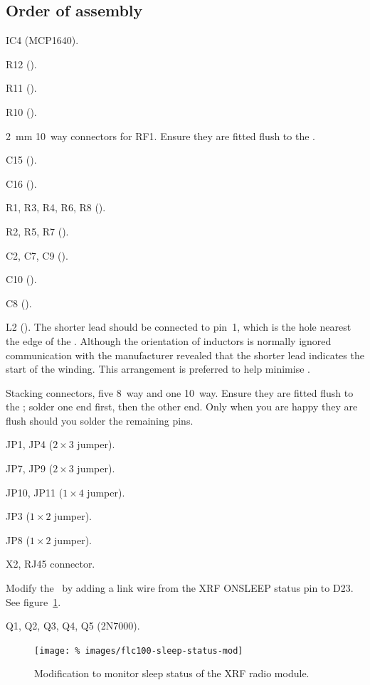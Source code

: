 \subsection{Order of assembly}
\begin{buildorder}
\item IC4 (MCP1640).
\item R12 ().
\item R11 ().
\item R10 ().
\item \SI{2}{\milli\metre} 10~way connectors for RF1. Ensure they are
  fitted flush to the \pcb.
\item C15 ().
\item C16 ().
\item R1, R3, R4, R6, R8 ().
\item R2, R5, R7 ().
\item C2, C7, C9 ().
\item C10 ().
\item C8 ().
\item L2 (). The shorter lead should be connected to pin~1,
  which is the hole nearest the edge of the \pcb. Although the
  orientation of inductors is normally ignored communication with the
  manufacturer revealed that the shorter lead indicates the start of
  the winding. This arrangement is preferred to help minimise \rfi.
\item Stacking connectors, five 8~way and one 10~way. Ensure they are
  fitted flush to the \pcb; solder one end first, then the other
  end. Only when you are happy they are flush should you solder the
  remaining pins.
\item JP1, JP4 ($2 \times 3$ jumper).
\item JP7, JP9 ($2 \times 3$ jumper).
\item JP10, JP11 ($1 \times 4$ jumper).
\item JP3 ($1 \times 2$ jumper).
\item JP8 ($1 \times 2$ jumper).
\item X2, RJ45 connector.
\item Modify the \pcb\ by adding a link wire from the XRF ONSLEEP
  status pin to D23. See figure~\ref{fig:flc100-sleep-status-mod}.
\item Q1, Q2, Q3, Q4, Q5 (2N7000).
\end{buildorder}

\begin{figure}
  \centering
  \texttt{[image: \%
    images/flc100-sleep-status-mod]}
  \caption[Modification to monitor sleep status of the XRF radio module]{%
    Modification to monitor sleep status of the XRF radio module.
    }
  \label{fig:flc100-sleep-status-mod}
\end{figure}


